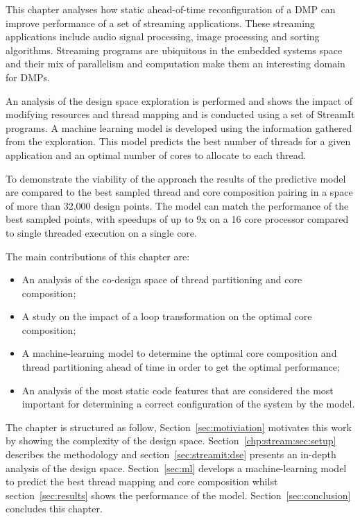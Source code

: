 This chapter analyses how static ahead-of-time reconfiguration of a DMP can improve performance of a set of streaming applications.
These streaming applications include audio signal processing, image processing and sorting algorithms.
Streaming programs are ubiquitous in the embedded systems space~\cite{theis2002streamit} and their mix of parallelism and computation make them an interesting domain for DMPs.

An analysis of the design space exploration is performed and shows the impact of modifying resources and thread mapping and is conducted using a set of StreamIt programs.
A machine learning model is developed using the information gathered from the exploration.
This model predicts the best number of threads for a given application and an optimal number of cores to allocate to each thread.

To demonstrate the viability of the approach the results of the predictive model are compared to the best sampled thread and core composition pairing in a space of more than 32,000 design points.
The model can match the performance of the best sampled points, with speedups of up to 9x on a 16 core processor compared to single threaded execution on a single core. 

The main contributions of this chapter are:
\begin{itemize}
\item An analysis of the co-design space of thread partitioning and core composition;
\vspace{-1em}
\item A study on the impact of a loop transformation on the optimal core composition;
\vspace{-1em}
\item A machine-learning model to determine the optimal core composition and thread partitioning ahead of time in order to get the optimal performance;
\vspace{-1em}
\item An analysis of the most static code features that are considered the most important for determining a correct configuration of the system by the model.
\end{itemize}


The chapter is structured as follow,
Section~\ref{sec:motiviation} motivates this work by showing the complexity of the design space.
Section~\ref{chp:stream:sec:setup} describes the methodology and section~\ref{sec:streamit:dse} presents an in-depth analysis of the design space.
Section~\ref{sec:ml} develops a machine-learning model to predict the best thread mapping and core composition whilst section~\ref{sec:results} shows the performance of the model.
Section~\ref{sec:conclusion} concludes this chapter.

